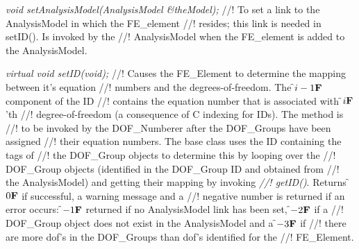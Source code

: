 {\em void setAnalysisModel(AnalysisModel \&theModel);}
//! To set a link to the AnalysisModel in which the FE\_element
//! resides; this link is needed in setID(). Is invoked by the
//! AnalysisModel when the FE\_element is added to the AnalysisModel.


{\em virtual void setID(void);}
//! Causes the FE\_Element to determine the mapping between it's equation
//! numbers and the degrees-of-freedom. The \f$i-1{\bf F}$ component of the ID
//! contains the equation number that is associated with \f$i{\bf F}$'th
//! degree-of-freedom (a consequence of C indexing for IDs). The method is
//! to be invoked by the DOF\_Numberer after the DOF\_Groups have been assigned
//! their equation numbers. The base class uses the ID containing the tags of
//! the DOF\_Group objects to determine this by looping over the
//! DOF\_Group objects (identified in the DOF\_Group ID and obtained from
//! the AnalysisModel) and getting their mapping by invoking {\em
//! getID()}. Returns \f$0{\bf F}$ if successful, a warning message and a
//! negative number is returned if an error occurs:
\f$-1{\bf F}$ returned if no AnalysisModel link has been set, \f$-2{\bf F}$ if a
//! DOF\_Group object does not exist in the AnalysisModel and a \f$-3{\bf F}$ if
//! there are more dof's in the DOF\_Groups than dof's identified for the
//! FE\_Element.


